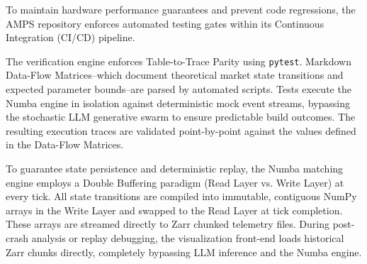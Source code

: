 To maintain hardware performance guarantees and prevent code regressions, the AMPS repository enforces automated testing gates within its Continuous Integration (CI/CD) pipeline.

The verification engine enforces Table-to-Trace Parity using \texttt{pytest}. Markdown Data-Flow Matrices--which document theoretical market state transitions and expected parameter bounds--are parsed by automated scripts. Tests execute the Numba engine in isolation against deterministic mock event streams, bypassing the stochastic LLM generative swarm to ensure predictable build outcomes. The resulting execution traces are validated point-by-point against the values defined in the Data-Flow Matrices.

To guarantee state persistence and deterministic replay, the Numba matching engine employs a Double Buffering paradigm (Read Layer vs. Write Layer) at every tick. All state transitions are compiled into immutable, contiguous NumPy arrays in the Write Layer and swapped to the Read Layer at tick completion. These arrays are streamed directly to Zarr chunked telemetry files. During post-crash analysis or replay debugging, the visualization front-end loads historical Zarr chunks directly, completely bypassing LLM inference and the Numba engine.

